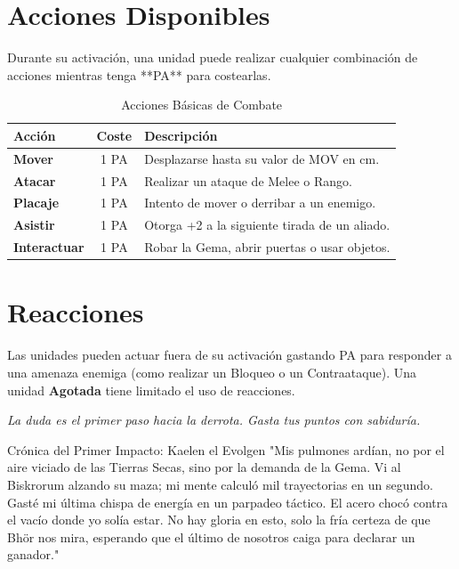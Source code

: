 \section{Acciones Disponibles}
Durante su activación, una unidad puede realizar cualquier combinación de acciones mientras tenga **PA** para costearlas.

\begin{table}[h]
\centering
\begin{tabularx}{\linewidth}{|l|c|X|}
\hline
\rowcolor{GoldRule!20} \textbf{Acción} & \textbf{Coste} & \textbf{Descripción} \\ \hline
\textbf{Mover} & 1 PA & Desplazarse hasta su valor de MOV en cm. \\ \hline
\textbf{Atacar} & 1 PA & Realizar un ataque de Melee o Rango. \\ \hline
\textbf{Placaje} & 1 PA & Intento de mover o derribar a un enemigo. \\ \hline
\textbf{Asistir} & 1 PA & Otorga +2 a la siguiente tirada de un aliado. \\ \hline
\textbf{Interactuar} & 1 PA & Robar la Gema, abrir puertas o usar objetos. \\ \hline
\end{tabularx}
\caption{Acciones Básicas de Combate}
\end{table}

\section{Reacciones}
Las unidades pueden actuar fuera de su activación gastando PA para responder a una amenaza enemiga (como realizar un Bloqueo o un Contraataque). Una unidad \textbf{Agotada} tiene limitado el uso de reacciones.

\vfill
\begin{center}
    \textit{La duda es el primer paso hacia la derrota. Gasta tus puntos con sabiduría.}
\end{center}


\begin{relato}{Crónica del Primer Impacto: Kaelen el Evolgen}
"Mis pulmones ardían, no por el aire viciado de las Tierras Secas, sino por la demanda de la Gema. Vi al Biskrorum alzando su maza; mi mente calculó mil trayectorias en un segundo. Gasté mi última chispa de energía en un parpadeo táctico. El acero chocó contra el vacío donde yo solía estar. No hay gloria en esto, solo la fría certeza de que Bhör nos mira, esperando que el último de nosotros caiga para declarar un ganador."
\end{relato}